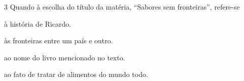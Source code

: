 

\num{3} Quando à escolha do título da matéria, ``Sabores sem fronteiras'',
refere-se

\begin{escolha}
\item à história de Ricardo.
\item às fronteiras entre um país e outro.
\item ao nome do livro mencionado no texto.
\item ao fato de tratar de alimentos do mundo todo.
\end{escolha}



